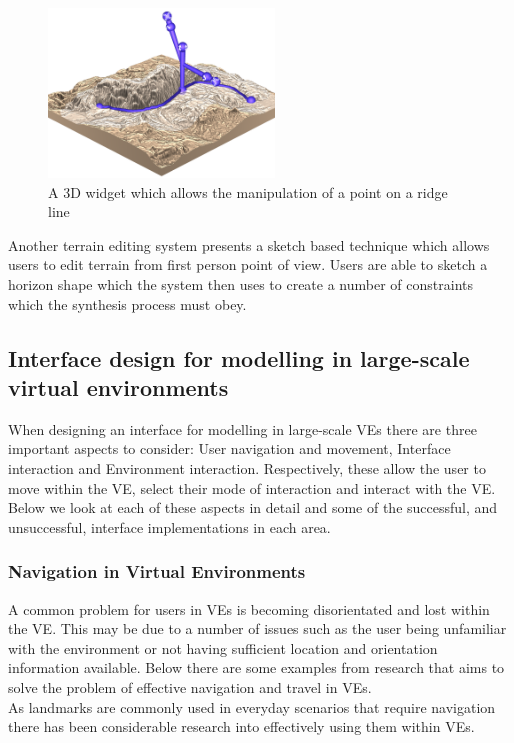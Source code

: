 \documentclass{sig-alternate-05-2015}
\begin{document}
\begin{figure}[H]
	\centering
	\includegraphics[width=6cm]{Terrain1}
	\caption{A 3D widget which allows the manipulation of a point on a ridge line}
\end{figure} 

Another terrain editing system presents a sketch based technique which allows users to  edit terrain from first person point of view\cite{Tasse2014}. Users are able to sketch a horizon shape which the system then uses to create a number of constraints which the synthesis process must obey.
\subsection{Interface design for modelling in large-scale virtual environments}
When designing an interface for modelling in large-scale VEs there are three important aspects to consider: User navigation and movement, Interface interaction and Environment interaction\cite{Bowman2001}. Respectively, these allow the user to move within the VE, select their mode of interaction and interact with the VE. Below we look at each of these aspects in detail and some of the successful, and unsuccessful, interface implementations in each area.
\subsubsection{Navigation in Virtual Environments}
A common problem for users in VEs is becoming disorientated and lost within the VE\cite{Darken1993}. This may be due to a number of issues such as the user being unfamiliar with the environment or not having sufficient location and orientation information available. Below there are some examples from research that aims to solve the problem of effective navigation and travel in VEs.\\

As landmarks are commonly used in everyday scenarios that require navigation there has been considerable research into effectively using them within VEs.
\end{document}

